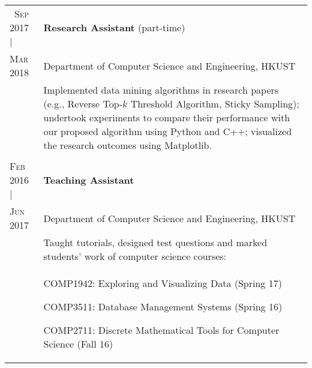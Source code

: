 \documentclass[10pt, oneside]{article}
\begin{document}
\begin{tabularx}{\linewidth}{p{2.2cm}|p{16cm}}
	\textsc{~Sep} 2017 | & \textbf{Research Assistant} (part-time)\\
	\textsc{Mar} 2018 & Department of Computer Science and Engineering, HKUST\\
	& Implemented data mining algorithms in research papers (e.g., Reverse Top-$k$ Threshold Algorithm, Sticky Sampling); undertook experiments to compare their performance with our proposed algorithm using Python and C++; visualized the research outcomes using Matplotlib.
	\\\\
	\textsc{Feb} 2016 | & \textbf{Teaching Assistant} \\
	\textsc{Jun} 2017 & Department of Computer Science and Engineering, HKUST\\
	& Taught tutorials, designed test questions and marked students' work of computer science courses: \\
	&	\begin{itemize}
		\vspace{0.1cm}
		\footnotesize{
			\item COMP1942: Exploring and Visualizing Data (Spring 17)
			\item COMP3511: Database Management Systems (Spring 16)
			\item COMP2711: Discrete Mathematical Tools for Computer Science (Fall 16) %
		}
	\end{itemize}
\end{tabularx}
\end{document}
